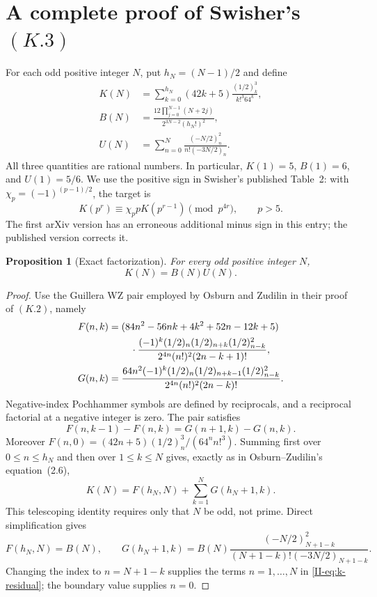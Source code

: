 \documentclass[11pt,letterpaper]{article}
\newtheorem{proposition}[theorem]{Proposition}
\numberwithin{equation}{section}
\begin{document}
\section{A complete proof of Swisher's \texorpdfstring{$(K.3)$}{(K.3)}}\label{loc-II-3}
\label{II-sec:k-reduction}

For each odd positive integer $N$, put $h_N=(N-1)/2$ and define
\begin{align}
 K(N)&=\sum_{k=0}^{h_N}(42k+5)
               \frac{(1/2)_k^3}{k!^3 64^k},\label{II-eq:k-sum}\\
 B(N)&=\frac{12\displaystyle\prod_{j=0}^{N-1}(N+2j)}
                {2^{3N-2}(h_N!)^2},\label{II-eq:k-prefactor}\\
 U(N)&=\sum_{n=0}^{N}
                \frac{(-N/2)_n^2}{n!(-3N/2)_n}.\label{II-eq:k-residual}
\end{align}
All three quantities are rational numbers. In particular,
$K(1)=5$, $B(1)=6$, and $U(1)=5/6$. We use the positive sign in
Swisher's published Table~2: with $\chi_p=(-1)^{(p-1)/2}$, the target is
\begin{equation}\label{II-eq:k-target}
 K(p^r)\equiv\chi_p pK(p^{r-1})\pmod{p^{4r}},\qquad p>5.
\end{equation}
The first arXiv version has an erroneous additional minus sign in this
entry; the published version corrects it.

\begin{proposition}[Exact factorization]\label{II-prop:k-factorization}
For every odd positive integer $N$,
\begin{equation}\label{II-eq:k-factorization}
 K(N)=B(N)U(N).
\end{equation}
\end{proposition}
\begin{proof}
Use the Guillera WZ pair employed by Osburn and Zudilin in their proof
of $(K.2)$, namely
\begin{align*}
 F(n,k)&=(84n^2-56nk+4k^2+52n-12k+5)\\
 &\hspace{8mm}\cdot
 \frac{(-1)^k(1/2)_n(1/2)_{n+k}(1/2)_{n-k}^{2}}
 {2^{4n}(n!)^2(2n-k+1)!},\\
 G(n,k)&=
 \frac{64n^2(-1)^k(1/2)_n(1/2)_{n+k-1}(1/2)_{n-k}^{2}}
 {2^{4n}(n!)^2(2n-k)!}.
\end{align*}
Negative-index Pochhammer symbols are defined by reciprocals, and a
reciprocal factorial at a negative integer is zero. The pair satisfies
\[
 F(n,k-1)-F(n,k)=G(n+1,k)-G(n,k).
\]
Moreover $F(n,0)=(42n+5)(1/2)_n^3/(64^n n!^3)$.
Summing first over $0\le n\le h_N$ and then over $1\le k\le N$
gives, exactly as in Osburn--Zudilin's equation~(2.6),
\[
 K(N)=F(h_N,N)+\sum_{k=1}^{N}G(h_N+1,k).
\]
This telescoping identity requires only that $N$ be odd, not prime.
Direct simplification gives
\[
 F(h_N,N)=B(N),\qquad
 G(h_N+1,k)=B(N)
 \frac{(-N/2)_{N+1-k}^{2}}
 {(N+1-k)!(-3N/2)_{N+1-k}}.
\]
Changing the index to $n=N+1-k$ supplies the terms $n=1,\ldots,N$
in \eqref{II-eq:k-residual}; the boundary value supplies $n=0$.
\end{proof}
\end{document}

